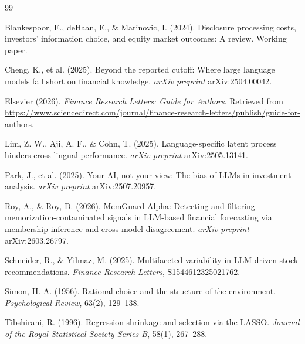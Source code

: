 \documentclass[11pt,letterpaper]{article}
\begin{document}
\renewcommand\refname{참고문헌}

\begin{thebibliography}{99}\setlength{\itemsep}{4pt}

Blankespoor, E., deHaan, E., \& Marinovic, I. (2024). Disclosure processing costs, investors' information choice, and equity market outcomes: A review. Working paper.

Cheng, K., et al. (2025). Beyond the reported cutoff: Where large language models fall short on financial knowledge. \textit{arXiv preprint} arXiv:2504.00042.

Elsevier (2026). \textit{Finance Research Letters: Guide for Authors}. Retrieved from \url{https://www.sciencedirect.com/journal/finance-research-letters/publish/guide-for-authors}.

Lim, Z. W., Aji, A. F., \& Cohn, T. (2025). Language-specific latent process hinders cross-lingual performance. \textit{arXiv preprint} arXiv:2505.13141.

Park, J., et al. (2025). Your AI, not your view: The bias of LLMs in investment analysis. \textit{arXiv preprint} arXiv:2507.20957.

Roy, A., \& Roy, D. (2026). MemGuard-Alpha: Detecting and filtering memorization-contaminated signals in LLM-based financial forecasting via membership inference and cross-model disagreement. \textit{arXiv preprint} arXiv:2603.26797.

Schneider, R., \& Yilmaz, M. (2025). Multifaceted variability in LLM-driven stock recommendations. \textit{Finance Research Letters}, S1544612325021762.

Simon, H. A. (1956). Rational choice and the structure of the environment. \textit{Psychological Review}, 63(2), 129--138.

Tibshirani, R. (1996). Regression shrinkage and selection via the LASSO. \textit{Journal of the Royal Statistical Society Series B}, 58(1), 267--288.

\end{thebibliography}
\end{document}
